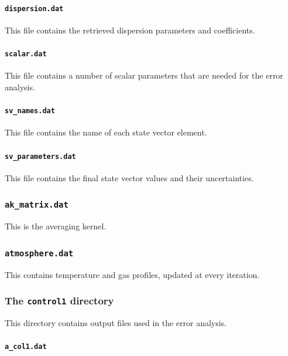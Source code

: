 \documentclass{article}
\begin{document}
\paragraph{\texttt{dispersion.dat}}

This file contains the retrieved dispersion parameters and coefficients.

\paragraph{\texttt{scalar.dat}}

This file contains a number of scalar parameters that are needed for
the error analysis.

\paragraph{\texttt{sv\_names.dat}}

This file contains the name of each state vector element.

\paragraph{\texttt{sv\_parameters.dat}}

This file contains the final state vector values and their uncertainties.

\subsubsection{\texttt{ak\_matrix.dat}}

This is the averaging kernel.

\subsubsection{\texttt{atmosphere.dat}}

This contains temperature and gas profiles, updated at every iteration.

\subsubsection{The \texttt{control1} directory}

This directory contains output files used in the error analysis.

\paragraph{\texttt{a\_col1.dat}}
\end{document}

